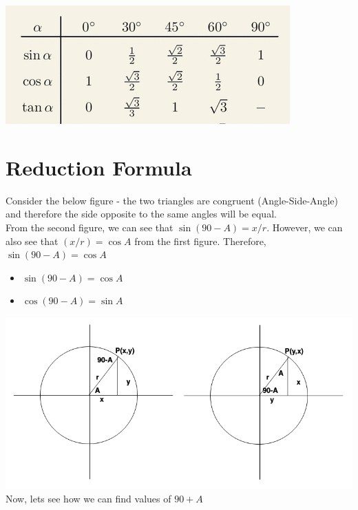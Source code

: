 \documentclass{book}
\begin{document}
	 \includegraphics[scale=0.6]{values} \\
	
	\section{Reduction Formula}
	
	Consider the below figure - the two triangles are congruent (Angle-Side-Angle) and therefore the side opposite to the same angles will be equal.\\
	From the second figure, we can see that $\sin(90-A) = {x/r}$. However, we can also see that $(x/r)= \cos{A}$ from the first figure. Therefore, $\sin{(90-A)}= \cos{A}$
	\begin{mdframed}[backgroundcolor=yellow]
		\begin{itemize}
			\item$\sin(90-A) = \cos{A}$
			\item $\cos(90-A) = \sin{A}$
			
		\end{itemize}
	\end{mdframed}
	
	\includegraphics[scale=0.6]{compangle} \\
	
	Now, lets see how we can find values of $90+A$ \\
	
\end{document}

